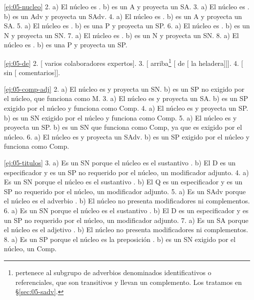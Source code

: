 \begin{solucion}{\ref{ej:05-nucleo}}
2. a) El núcleo es . b)  es un A y proyecta un SA. 3.
a) El núcleo es . b)  es un Adv y proyecta un SAdv. 4.
a) El núcleo es . b)  es un A y proyecta
un SA. 5. a) El núcleo es . b)  es una P y proyecta un
SP. 6. a) El núcleo es . b)  es un N y
proyecta un SN. 7. a) El núcleo es . b)  es un N y
proyecta un SN. 8. a) El núcleo es . b)  es una P y
proyecta un SP.
\end{solucion}

\begin{solucion}{\ref{ej:05-de}}
2. [ varios colaboradores expertos]. 3.
[ arriba\footnote{ pertenece al subgrupo de
adverbios denominados identificativos o referenciales, que son transitivos y
llevan un complemento. Los tratamos en §\ref{sec:05-sadv}.} [
de [ la heladera]]]. 4. [
sin [ comentarios]].
\end{solucion}

\begin{solucion}{\ref{ej:05-comp-adj}}
2. a) El núcleo es  y proyecta un SN. b)  es un SP
no exigido por el núcleo, que funciona como M. 3. a) El núcleo es
 y proyecta un SA. b)  es un SP exigido
por el núcleo y funciona como Comp. 4. a) El núcleo es  y proyecta un
SP. b)  es un SN exigido por el núcleo y funciona como Comp.
5. a) El núcleo es  y proyecta un SP. b)  es un SN
que funciona como Comp, ya que es exigido por el núcleo. 6. a) El núcleo es
 y proyecta un SAdv. b)  es un SP exigido por el
núcleo y funciona como Comp.
\end{solucion}

\begin{solucion}{\ref{ej:05-titulos}}
3. a) Es un SN porque el núcleo es el sustantivo . b) El D
 es un especificador y  es un SP no requerido
por el núcleo, un modificador adjunto. 4. a) Es un SN porque el núcleo es el
sustantivo . b) El Q  es un especificador y  es un SP no requerido por el núcleo, un modificador adjunto. 5. a) Es
un SAdv porque el núcleo es el adverbio . b) El núcleo no
presenta modificadores ni complementos. 6. a) Es un SN porque el núcleo es el
sustantivo . b) El D  es un especificador y  es un SP no requerido por el núcleo, un modificador adjunto. 7. a) Es
un SA porque el núcleo es el adjetivo . b) El núcleo no presenta
modificadores ni complementos. 8. a) Es un SP porque el núcleo es la preposición
. b)  es un SN exigido por el núcleo, un Comp.
\end{solucion}

